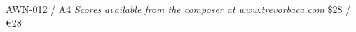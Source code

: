 \documentclass[11pt]{report}
\begin{document}
\null \vfill

AWN-012 / A4 \hfill
\textit{Scores available from the composer at www.trevorbaca.com}
\hfill \$28 / \euro 28
\end{document}
